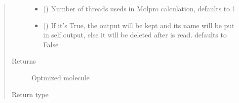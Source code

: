 \documentclass[letterpaper,10pt,english]{sphinxmanual}
\begin{document}
\begin{fulllineitems}
\begin{quote}
\begin{description}
\begin{itemize}
\item {} 
\sphinxAtStartPar
{} (\sphinxstyleliteralemphasis{\sphinxupquote{, }}) \textendash{} Number of threads useds in Molpro calculation, defaults to 1

\item {} 
\sphinxAtStartPar
{} (\sphinxstyleliteralemphasis{\sphinxupquote{, }}) \textendash{} If it’s True, the output will be kept and its name will be put in self.output, else it will be 
deleted after is read. defaults to False

\end{itemize}

\item[{Returns}] \leavevmode
\sphinxAtStartPar
Optmized molecule

\item[{Return type}] \leavevmode
\sphinxAtStartPar
{\hyperref[\detokenize{MolOpt.molecular:MolOpt.molecular.molecular.Molecule}]{}}

\end{description}\end{quote}

\end{fulllineitems}

\end{document}
